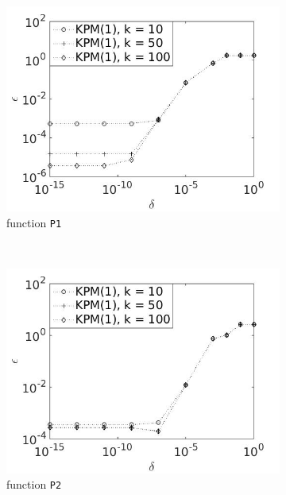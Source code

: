 \begin{figure}[H]
        \centering
        \begin{subfigure}[b]{0.45\textwidth}
                \includegraphics[width=\textwidth]{fig/s22errvstol1k}
                \caption{function \texttt{P1}}
                \label{fig:epsilondelta1k}
        \end{subfigure}
~
        \begin{subfigure}[b]{0.45\textwidth}
                \includegraphics[width=\textwidth]{fig/s23errvstol2k}
                \caption{ function \texttt{P2}}
                \label{fig:epsilondelta2k}
        \end{subfigure}
                \begin{subfigure}[b]{0.45\textwidth}

\end{subfigure}
\end{figure}
